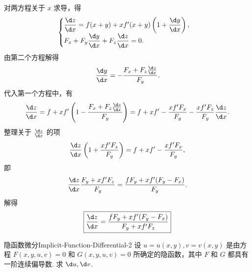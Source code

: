 \begin{solution}
    对两方程关于 $x$ 求导，得
    \begin{equation}
        \begin{cases}
            \dfrac{\d z}{\d x} = f(x+y) + x f'(x+y) \left( 1 + \dfrac{\d y}{\d x} \right), \\
            F_x + F_y \dfrac{\d y}{\d x} + F_z \dfrac{\d z}{\d x} = 0.
        \end{cases}
    \end{equation}
    由第二个方程解得
    \begin{equation}
        \dfrac{\d y}{\d x} = -\frac{F_x + F_z \frac{\d z}{\d x}}{F_y}.
    \end{equation}
    代入第一个方程中，有
    \begin{equation}
        \frac{\d z}{\d x} = f + x f' \left( 1 - \frac{F_x + F_z \frac{\d z}{\d x}}{F_y} \right) = f + x f' - \frac{x f' F_x}{F_y} - \frac{x f' F_z}{F_y} \frac{\d z}{\d x}.
    \end{equation}
    整理关于 $\frac{\d z}{\d x}$ 的项
    \begin{equation}
        \frac{\d z}{\d x} \left( 1 + \frac{x f' F_z}{F_y} \right) = f + x f' - \frac{x f' F_x}{F_y},
    \end{equation}
    即
    \begin{equation}
        \frac{\d z}{\d x} \frac{F_y + x f' F_z}{F_y} = \frac{f F_y + x f'(F_y - F_x)}{F_y}.
    \end{equation}
    解得
    \begin{equation}
        \boxed{\frac{\d z}{\d x} = \frac{f F_y + x f'(F_y - F_x)}{F_y + x f' F_z}}
    \end{equation}
\end{solution}

\begin{problem}{隐函数微分}{Implicit-Function-Differential-2}
    设 $u = u(x,y), v = v(x,y)$ 是由方程 $F(x,y,u,v) = 0$ 和 $G(x,y,u,v) = 0$ 所确定的隐函数，其中 $F$ 和 $G$ 都具有一阶连续偏导数. 求 $\d u, \d v$.
\end{problem}

